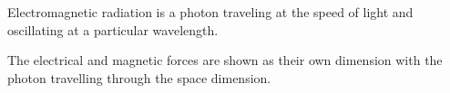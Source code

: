 



Electromagnetic radiation is a photon traveling at the speed of light and oscillating at a particular wavelength.

The electrical and magnetic forces are shown as their own dimension with the photon travelling through the space dimension.
